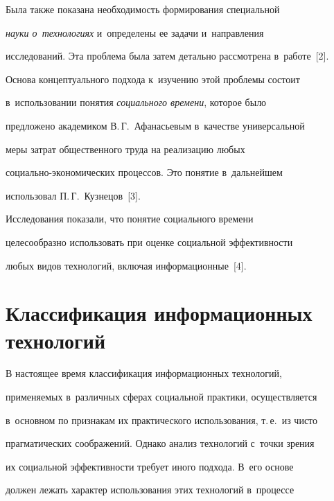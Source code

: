    


   Была также показана необходимость формирования специальной 


\textit{науки о~технологиях} и~определены ее задачи и~на\-прав\-ле\-ния 


исследований. Эта проб\-ле\-ма была затем детально рас\-смот\-ре\-на в~работе~[2].


   


   Основа концептуального подхода к~изуче\-нию этой проб\-ле\-мы со\-сто\-ит 


в~использовании понятия \textit{социального времени}, которое было 


предложено академиком В.\,Г.~Афанасьевым в~качестве универсальной 


меры за\-трат общественного труда на реализацию любых  


со\-ци\-аль\-но-эко\-но\-ми\-че\-ских процессов. Это понятие в~дальнейшем 


использовал П.\,Г.~Куз\-не\-цов~[3]. 


   


   Исследования показали, что понятие социального времени 


целесообразно использовать при оцен\-ке социальной эф\-фек\-тив\-ности 


любых видов технологий, включая информационные~[4].


   


   \section{Классификация информационных технологий}


   


   В настоящее время классификация информационных технологий, 


при\-ме\-ня\-емых в~различных сферах социальной практики, осуществляется 


в~основ\-ном по признакам их практического использования, т.\,е.\ из чис\-то 


праг\-ма\-ти\-че\-ских соображений. Однако анализ технологий с~точ\-ки зрения 


их социальной эф\-фек\-тив\-ности требует иного подхода. В~его основе 


должен лежать характер использования этих технологий в~процессе 


